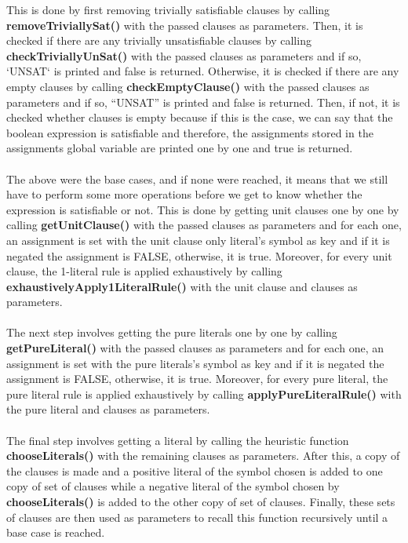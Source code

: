 \documentclass{article}
\newcommand{\quotes}[1]{``#1''}
\begin{document}
\begin{enumerate}
		This is done by first removing trivially satisfiable clauses by calling \textbf{removeTriviallySat()} with the passed clauses as parameters. Then, it is checked if there are any trivially unsatisfiable clauses by calling \textbf{checkTriviallyUnSat()} with the passed clauses as parameters and if so, `UNSAT` is printed and false is returned.
		Otherwise, it is checked if there are any empty clauses by calling \textbf{checkEmptyClause()} with the passed clauses as parameters and if so, \quotes{UNSAT} is printed and false is returned.
		Then, if not, it is checked whether clauses is empty because if this is the case, we can say that the boolean expression is satisfiable and therefore, the assignments stored in the assignments global variable are printed one by one and true is returned.\\\\
		The above were the base cases, and if none were reached, it means that we still have to perform some more operations before we get to know whether the expression is satisfiable or not. This is done by getting unit clauses one by one by calling \textbf{getUnitClause()} with the passed clauses as parameters and for each one, an assignment is set with the unit clause only literal's symbol as key and if it is negated the assignment is FALSE, otherwise, it is true. Moreover, for every unit clause, the 1-literal rule is applied exhaustively by calling \textbf{exhaustivelyApply1LiteralRule()} with the unit clause and clauses as parameters. \\\\
		The next step involves getting the pure literals one by one by calling \textbf{getPureLiteral()} with the passed clauses as parameters and for each one, an assignment is set with the pure literals's symbol as key and if it is negated the assignment is FALSE, otherwise, it is true. Moreover, for every pure literal, the pure literal rule is applied exhaustively by calling \textbf{applyPureLiteralRule()} with the pure literal and clauses as parameters. \\\\ 
		The final step involves getting a literal by calling the heuristic function \textbf{chooseLiterals()} with the remaining clauses as parameters. After this, a copy of the clauses is made and a positive literal of the symbol chosen is added to one copy of set of clauses while a negative literal of the symbol chosen by  \textbf{chooseLiterals()} is added to the other copy of set of clauses. Finally, these sets of clauses are then used as parameters to recall this function recursively until a base case is reached.
		
						
		\end{enumerate}					
		
\end{document}
